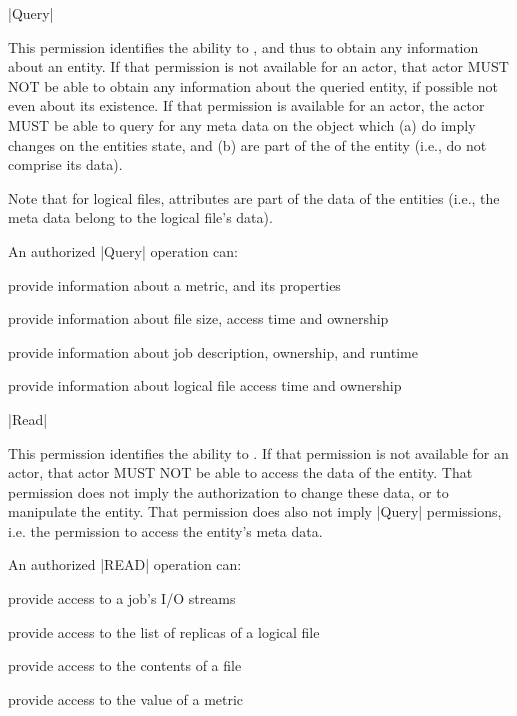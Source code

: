 \begin{list}{}{}
 
  \item{\sunshift|Query|}
  
  This permission identifies the ability to , and thus to obtain any information about
  an entity.  If that permission is not available for an actor,
  that actor MUST NOT be able to obtain any information about
  the queried entity, if possible not even about its existence.
  If that permission is available for an actor, the actor MUST
  be able to query for any meta data on the object which (a) do
  imply changes on the entities state, and (b) are part of the
   of the entity (i.e., do not comprise its data).
 
  Note that for logical files, attributes are part of the data
  of the entities (i.e., the meta data belong to the logical
  file's data).
 
  An authorized |Query| operation can:
 
  \begin{shortlist}
   \item provide information about a metric, and its properties
   \item provide information about file size, access time and ownership
   \item provide information about job description, ownership, and runtime
   \item provide information about logical file access time and ownership
  \end{shortlist}
 
 
  \item{\sunshift|Read|}
 
  This permission identifies the ability to .  If that permission is
  not available for an actor, that actor MUST NOT be able to
  access the data of the entity.  That permission does not imply
  the authorization to change these data, or to manipulate the
  entity.  That permission does also not imply |Query|
  permissions, i.e. the permission to access the entity's meta
  data.
 
  An authorized |READ| operation can:
 
  \begin{shortlist}
   \item provide access to a job's I/O streams
   \item provide access to the list of replicas of a logical file
   \item provide access to the contents of a file
   \item provide access to the value of a metric
  \end{shortlist}
 

\end{list}
